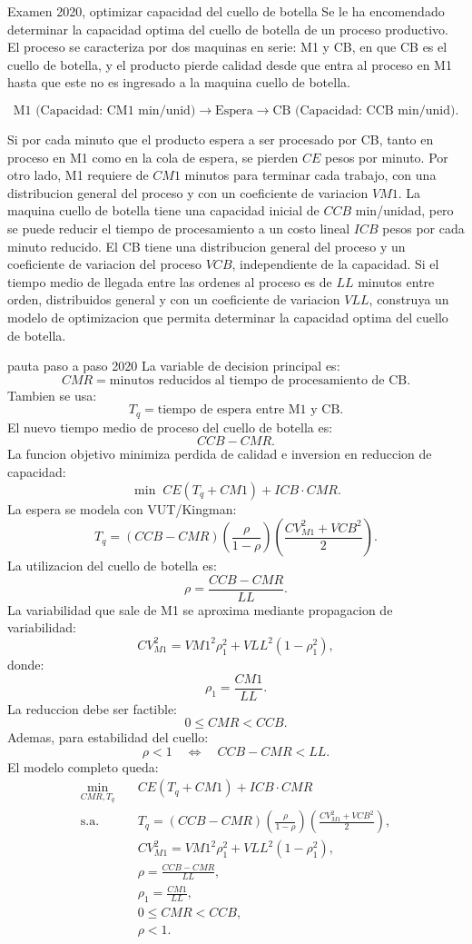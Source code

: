 \begin{enunciado}{Examen 2020, optimizar capacidad del cuello de botella}
Se le ha encomendado determinar la capacidad optima del cuello de botella de un proceso productivo. El proceso se caracteriza por dos maquinas en serie: M1 y CB, en que CB es el cuello de botella, y el producto pierde calidad desde que entra al proceso en M1 hasta que este no es ingresado a la maquina cuello de botella.

\[
  \text{M1 (Capacidad: CM1 min/unid)}
  \rightarrow
  \text{Espera}
  \rightarrow
  \text{CB (Capacidad: CCB min/unid)}.
\]

Si por cada minuto que el producto espera a ser procesado por CB, tanto en proceso en M1 como en la cola de espera, se pierden $CE$ pesos por minuto. Por otro lado, M1 requiere de $CM1$ minutos para terminar cada trabajo, con una distribucion general del proceso y con un coeficiente de variacion $VM1$. La maquina cuello de botella tiene una capacidad inicial de $CCB$ min/unidad, pero se puede reducir el tiempo de procesamiento a un costo lineal $ICB$ pesos por cada minuto reducido. El CB tiene una distribucion general del proceso y un coeficiente de variacion del proceso $VCB$, independiente de la capacidad. Si el tiempo medio de llegada entre las ordenes al proceso es de $LL$ minutos entre orden, distribuidos general y con un coeficiente de variacion $VLL$, construya un modelo de optimizacion que permita determinar la capacidad optima del cuello de botella.
\end{enunciado}

\begin{pautacompleta}{pauta paso a paso 2020}
La variable de decision principal es:
\[
  CMR=\text{minutos reducidos al tiempo de procesamiento de CB}.
\]
Tambien se usa:
\[
  T_q=\text{tiempo de espera entre M1 y CB}.
\]
El nuevo tiempo medio de proceso del cuello de botella es:
\[
  CCB-CMR.
\]
La funcion objetivo minimiza perdida de calidad e inversion en reduccion de capacidad:
\[
  \min\; CE(T_q+CM1)+ICB\cdot CMR.
\]
La espera se modela con VUT/Kingman:
\[
  T_q=(CCB-CMR)
  \left(\frac{\rho}{1-\rho}\right)
  \left(\frac{CV_{M1}^2+VCB^2}{2}\right).
\]
La utilizacion del cuello de botella es:
\[
  \rho=\frac{CCB-CMR}{LL}.
\]
La variabilidad que sale de M1 se aproxima mediante propagacion de variabilidad:
\[
  CV_{M1}^2=VM1^2\rho_1^2+VLL^2(1-\rho_1^2),
\]
donde:
\[
  \rho_1=\frac{CM1}{LL}.
\]
La reduccion debe ser factible:
\[
  0\leq CMR<CCB.
\]
Ademas, para estabilidad del cuello:
\[
  \rho<1
  \quad\Leftrightarrow\quad
  CCB-CMR<LL.
\]
El modelo completo queda:
\[
\begin{aligned}
\min_{CMR,T_q}\quad & CE(T_q+CM1)+ICB\cdot CMR\\
\text{s.a.}\quad
&T_q=(CCB-CMR)
  \left(\frac{\rho}{1-\rho}\right)
  \left(\frac{CV_{M1}^2+VCB^2}{2}\right),\\
&CV_{M1}^2=VM1^2\rho_1^2+VLL^2(1-\rho_1^2),\\
&\rho=\frac{CCB-CMR}{LL},\\
&\rho_1=\frac{CM1}{LL},\\
&0\leq CMR<CCB,\\
&\rho<1.
\end{aligned}
\]
\end{pautacompleta}

